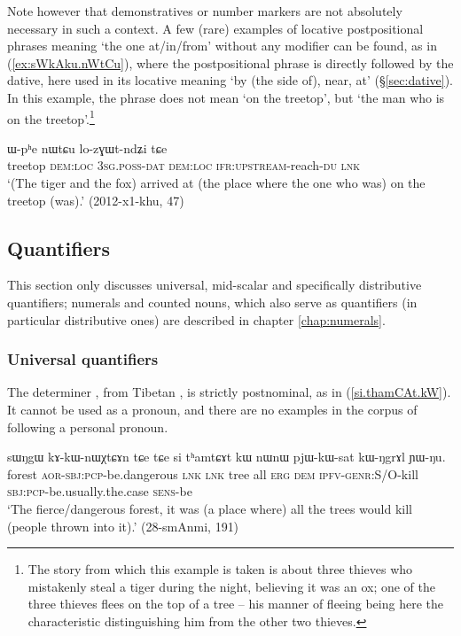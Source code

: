 Note however that demonstratives or number markers are not absolutely necessary in such a context. A few (rare) examples of locative postpositional phrases meaning `the one at/in/from' without any modifier can be found, as in (\ref{ex:sWkAku.nWtCu}), where the postpositional phrase is directly followed by the dative, here used in its locative meaning `by (the side of), near, at' (§\ref{sec:dative}). In this example, the phrase  does not mean `on the treetop', but `the man who is on the treetop'.\footnote{The story from which this example is taken is about three thieves who mistakenly steal a tiger during the night, believing it was an ox; one of the three thieves flees on the top of a tree -- his manner of fleeing being here the characteristic distinguishing him from the other two thieves.}

\begin{exe}
\ex \label{ex:sWkAku.nWtCu}
 ɯ-pʰe nɯtɕu lo-zɣɯt-ndʑi tɕe\\
treetop \textsc{dem}:\textsc{loc} \textsc{3sg}.\textsc{poss}-\textsc{dat} \textsc{dem}:\textsc{loc}  \textsc{ifr}:\textsc{upstream}-reach-\textsc{du} \textsc{lnk}\\
\glt `(The tiger and the fox) arrived at (the place where the one who was) on the treetop (was).' (2012-x1-khu, 47)
\end{exe}

\subsection{Quantifiers} \label{sec:quantifiers.determiners}
This section only discusses universal, mid-scalar and specifically distributive quantifiers; numerals and counted nouns, which also serve as quantifiers (in particular distributive ones) are described in chapter \ref{chap:numerals}.

\subsubsection{Universal quantifiers} \label{sec:universal.quant}
The determiner , from Tibetan , is strictly postnominal, as in (\ref{si.thamCAt.kW}). It cannot be used as a pronoun, and there are no examples in the corpus of  following a personal pronoun.

\begin{exe}
\ex \label{si.thamCAt.kW}
 \gll   sɯŋgɯ kɤ-kɯ-nɯχtɕɤn tɕe tɕe si tʰamtɕɤt kɯ nɯnɯ pjɯ-kɯ-sat kɯ-ŋgrɤl ɲɯ-ŋu. \\
 forest \textsc{aor}-\textsc{sbj}:\textsc{pcp}-be.dangerous \textsc{lnk} \textsc{lnk} tree all \textsc{erg} \textsc{dem} \textsc{ipfv}-\textsc{genr}:S/O-kill  \textsc{sbj}:\textsc{pcp}-be.usually.the.case \textsc{sens}-be \\
 \glt `The fierce/dangerous forest, it was (a place where) all the trees would kill (people thrown into it).' (28-smAnmi, 191)
\end{exe}
 
